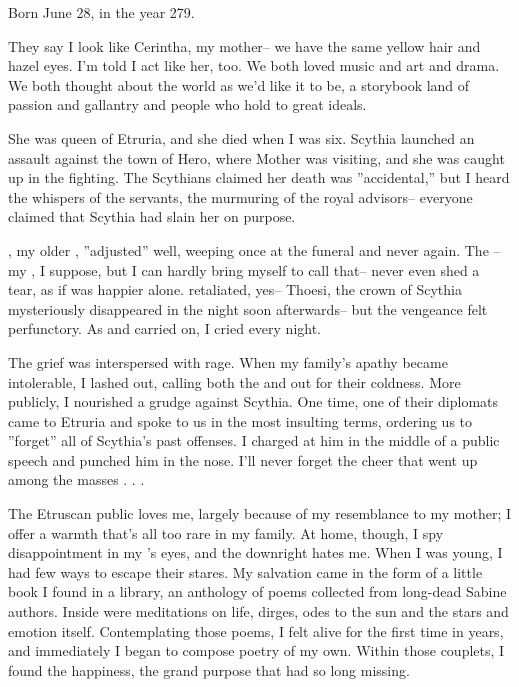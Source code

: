 \documentclass[char]{Kos}
\begin{document}
\name{\cPoet{}}

Born June 28, in the year 279.

They say I look like Cerintha, my mother-- we have the same yellow hair and hazel eyes. I'm told I act like her, too. We both loved music and art and drama. We both thought about the world as we'd like it to be, a storybook land of passion and gallantry and people who hold to great ideals. 

She was queen of Etruria, and she died when I was six. Scythia launched an assault against the town of Hero, where Mother was visiting, and she was caught up in the fighting. The Scythians claimed her death was ''accidental,'' but I heard the whispers of the servants, the murmuring of the royal advisors-- everyone claimed that Scythia had slain her on purpose. 

\cGroom{}, my older \cGroom{\sibling}, ''adjusted'' well, weeping once at the funeral and never again. The \cEtruriaKing{\monarch}-- my \cEtruriaKing{\parent}, I suppose, but I can hardly bring myself to call \cEtruriaKing{\them} that-- never even shed a tear, as if \cEtruriaKing{\they} was happier alone. \cEtruriaKing{\They} retaliated, yes-- Thoesi, the crown  of Scythia mysteriously disappeared in the night soon afterwards-- but the vengeance felt perfunctory. As \cEtruriaKing{\they} and \cGroom{} carried on, I cried every night.

The grief was interspersed with rage. When my family's apathy became intolerable, I lashed out, calling both the \cEtruriaKing{\monarch} and \cGroom{} out for their coldness. More publicly, I nourished a grudge against Scythia. One time, one of their diplomats came to Etruria and spoke to us in the most insulting terms, ordering us to ''forget'' all of Scythia's past offenses. I charged at him in the middle of a public speech and punched him in the nose. I'll never forget the cheer that went up among the masses . . .

The Etruscan public loves me, largely because of my resemblance to my mother; I offer a warmth that's all too rare in my family. At home, though, I spy disappointment in my \cGroom{\sibling}'s eyes, and the \cEtruriaKing{\monarch} downright hates me. When I was young, I had few ways to escape their stares. My salvation came in the form of a little book I found in a library, an anthology of poems collected from long-dead Sabine authors. Inside were meditations on life, dirges, odes to the sun and the stars and emotion itself. Contemplating those poems, I felt alive for the first time in years, and immediately I began to compose poetry of my own. Within those couplets, I found the happiness, the grand purpose that had so long missing.
\end{document}
